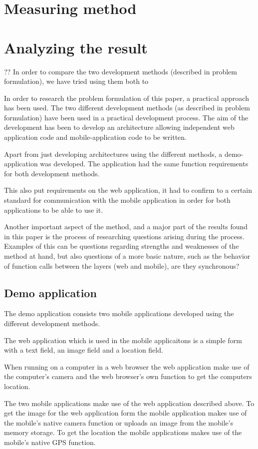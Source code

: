 \section{Measuring method}
\section{Analyzing the result}
??
In order to compare the two development methods (described in problem formulation), we have tried using them both to 

In order to research the problem formulation of this paper, a practical approach has been used. The two different development methods (as described in problem formulation) have been used in a practical development process. The aim of the development has been to develop an architecture allowing independent web application code and mobile-application code to be written.

Apart from just developing architectures using the different methods, a demo-application was developed. The application had the same function requirements for both development methods.

This also put requirements on the web application, it had to confirm to a certain standard for communication with the mobile application in order for both applications to be able to use it. 

Another important aspect of the method, and a major part of the results found in this paper is the process of researching questions arising during the process. Examples of this can be questions regarding strengths and weaknesses of the method at hand, but also questions of a more basic nature, such as the behavior of function calls between the layers (web and mobile), are they synchronous?

\subsection{Demo application}
The demo application consists two mobile applications developed using the different development methods. 

The web application which is used in the mobile applicaitons is a simple form with a text field, an image field and a location field.

When running on a computer in a web browser the web application make use of the computer's camera and the web browser's own function to get the computers location.

The two mobile applications make use of the web application described above. To get the image for the web application form the mobile application makes use of the mobile's native camera function or uploads an image from the mobile's memory storage. To get the location the mobile applications makes use of the mobile's native GPS function. 

